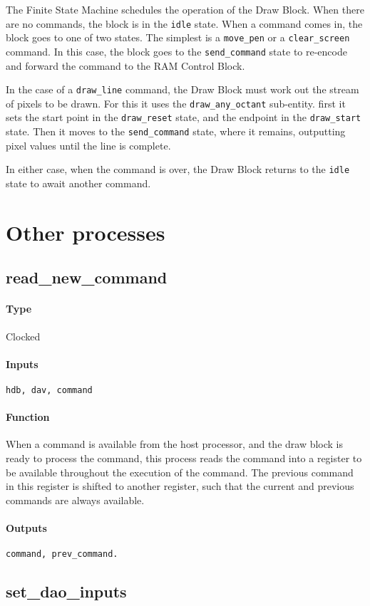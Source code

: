 \documentclass[12pt]{article}
\begin{document}
The Finite State Machine schedules the operation of the Draw
Block. When there are no commands, the block is in the \verb|idle|
state. When a command comes in, the block goes to one of two
states. The simplest is a \verb|move_pen| or a \verb|clear_screen|
command. In this case, the block goes to the \verb|send_command| state
to re-encode and forward the command to the RAM Control Block.

In the case of a \verb|draw_line| command, the Draw Block must work
out the stream of pixels to be drawn. For this it uses the
\verb|draw_any_octant| sub-entity. first it sets the start point in
the \verb|draw_reset| state, and the endpoint in the \verb|draw_start|
state. Then it moves to the \verb|send_command| state, where it
remains, outputting pixel values until the line is complete.

In either case, when the command is over, the Draw Block returns to
the \verb|idle| state to await another command.

\section{Other processes}
\subsection{read\_new\_command}
\paragraph{Type}
Clocked
\paragraph{Inputs}
\verb|hdb, dav, command|
\paragraph{Function}
When a command is available from the host processor, and the draw
block is ready to process the command, this process reads the command
into a register to be available throughout the execution of the
command. The previous command in this register is shifted to another
register, such that the current and previous commands are always
available.
\paragraph{Outputs}
\verb|command, prev_command.|

\subsection{set\_dao\_inputs}
\end{document}
